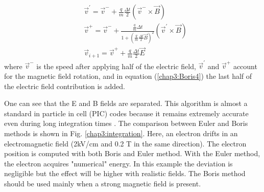 \begin{refsection}
\begin{align}
     & \vec{v}^{'} = \vec{v}^{-} + \frac{q}{m} \frac{\Delta t}{2}(\vec{v}^{-} \times \vec{B})                                            \\
     & \vec{v}^{+} = \vec{v}^{-} + \frac{\frac{q}{m}\Delta t}{1+(\frac{q}{m} \frac{\Delta t}{2}\vec{B})^{2}}(\vec{v}^{'} \times \vec{B}) \\
     & \vec{v}_{i+1} = \vec{v}^{+} + \frac{q}{m} \frac{\Delta t}{2}\vec{E} \label{chap3:Boris4}
  \end{align}
  where $\vec{v}^{-}$ is the speed after applying half of the electric field, $\vec{v}^{'}$ and $\vec{v}^{+}$ account for the magnetic field rotation, and in equation (\ref{chap3:Boris4}) the last half of the electric field contribution is added.

  One can see that the E and B fields are separated. This algorithm is almost a standard in particle in cell (PIC) codes because it remains extremely accurate even during long integration times \cite{Qin2013}. The comparison between Euler and Boris methods is shown in Fig. \ref{chap3:integration}. Here, an electron drifts in an electromagnetic field (2kV/cm and 0.2 T in the same direction). The electron position is computed with both Boris and Euler method. With the Euler method, the electron acquires "numerical" energy. In this example the deviation is negligible but the effect will be higher with realistic fields. The Boris method should be used mainly when a strong magnetic field is present.


\end{refsection}
